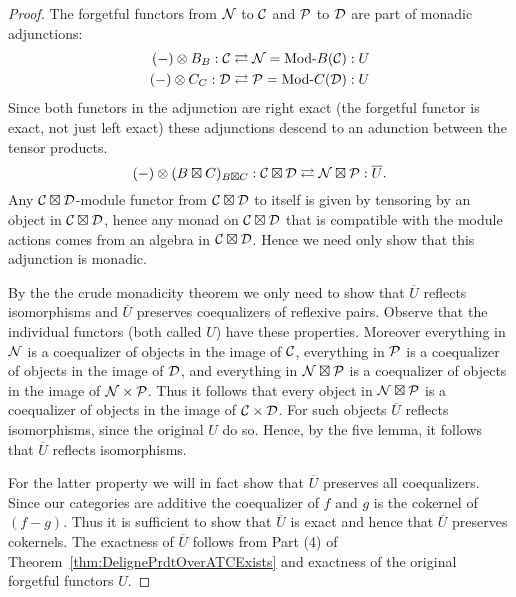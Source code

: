\documentclass{amsart}
\begin{document}
\begin{proof}
	The forgetful functors from $\mathcal N$ to $\mathcal C$ and $\mathcal P$ to $\mathcal D$ are part of monadic adjunctions:
	\begin{align*}
		(-) \otimes B_{B}:\cC \rightleftarrows \cN = \Mod{}{B}(\cC): U \\
		(-) \otimes C_{C}:\cD \rightleftarrows \cP = \Mod{}{C}(\cD): U
	\end{align*}
	Since both functors in the adjunction are right exact (the forgetful functor is exact, not just left exact) these adjunctions descend to an adunction between the tensor products. 
	\begin{equation*}
		(-) \otimes (B \boxtimes C)_{B \boxtimes C}: \mathcal C \boxtimes \mathcal D \rightleftarrows \mathcal N \boxtimes \mathcal P: \overline{U}.
	\end{equation*}
	Any $\mathcal C \boxtimes \mathcal D$-module functor from $\mathcal C \boxtimes \mathcal D$ to itself is given by tensoring by an object in $\mathcal C \boxtimes \mathcal D$, hence any monad on $\mathcal C \boxtimes \mathcal D$ that is compatible with the module actions comes from an algebra in $\mathcal C \boxtimes \mathcal D$.  Hence we need only show that this adjunction is monadic.  
		
	By the the crude monadicity theorem \cite[\S~3.5]{MR771116} we only need to show that $\overline{U}$ reflects isomorphisms and $\overline{U}$ preserves coequalizers of reflexive pairs.  Observe that the individual functors (both called $U$) have these properties. Moreover everything in $\mathcal N$ is a coequalizer of objects in the image of $\mathcal C$, everything in $\mathcal P$ is a coequalizer of objects in the image of $\mathcal D$, and everything in $\mathcal N \boxtimes \mathcal P$ is a coequalizer of objects in the image of $\mathcal N \times \mathcal P$. Thus it follows that every object in $\mathcal N \boxtimes \mathcal P$ is a coequalizer of objects in the image of $\mathcal C \times \mathcal D$. For such objects $\overline{U}$ reflects isomorphisms, since the original $U$ do so. Hence, by the five lemma, it follows that $\overline{U}$ reflects isomorphisms. 

For the latter property we will in fact show that $\overline{U}$ preserves all coequalizers. Since our categories are additive the coequalizer of $f$ and $g$ is the cokernel of $(f-g)$.  Thus it is sufficient to show that $\overline{U}$ is exact and hence that $\overline{U}$ preserves cokernels.  The exactness of $\overline{U}$ follows from Part (4) of Theorem~\ref{thm:DelignePrdtOverATCExists} and exactness of the original forgetful functors $U$.  
\end{proof}




\end{document}
